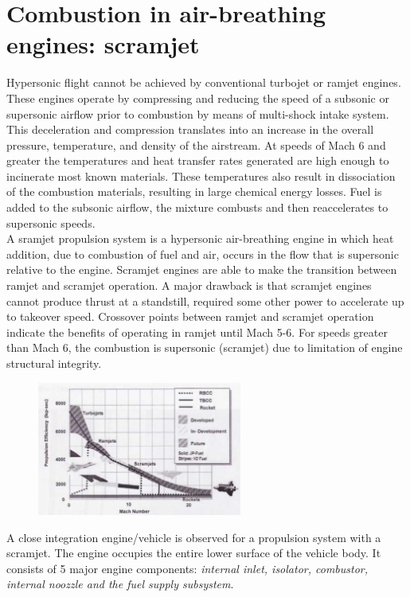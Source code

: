 \documentclass[12pt]{article}
\begin{document}
\newpage

\section{Combustion in air-breathing engines: scramjet}

Hypersonic flight cannot be achieved by conventional turbojet or ramjet engines. These engines operate by compressing and reducing the speed of a subsonic or supersonic airflow prior to combustion by means of multi-shock intake system. This deceleration and compression translates into an increase in the overall pressure, temperature, and density of the airstream. At speeds of Mach 6 and greater the temperatures and heat transfer rates generated are high enough to incinerate most known materials. These temperatures also
result in dissociation of the combustion materials, resulting in large chemical energy losses. Fuel is added to the subsonic airflow, the mixture combusts and then reaccelerates to supersonic speeds.\\
A sramjet propulsion system is a hypersonic air-breathing engine in which heat addition, due to combustion of fuel and air, occurs in the flow that is supersonic relative to the engine. Scramjet engines are able to make the transition between ramjet and scramjet operation.  A major drawback is
that scramjet engines cannot produce thrust at a standstill, required some other power to accelerate up to takeover speed.
Crossover points between ramjet and scramjet operation indicate the benefits of operating in ramjet until Mach 5-6. For speeds greater than Mach 6, the combustion is supersonic (scramjet) due to limitation of engine structural integrity.

\begin{figure}[!ht]
\centering
\includegraphics[width=0.6\textwidth]{figures/ramjetcomp.png}
\end{figure}

A close integration engine/vehicle is observed for a propulsion system with a scramjet. The engine occupies the entire lower surface of the vehicle body. It consists of 5 major engine components: \textit{internal inlet, isolator, combustor, internal noozzle and the fuel supply subsystem}.
\end{document}
